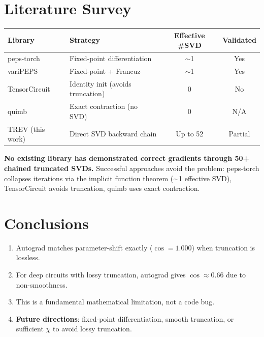 \documentclass[11pt]{article}
\begin{document}
\section{Literature Survey}

\begin{center}
\begin{tabular}{p{2.8cm}p{4.5cm}cc}
\toprule
Library & Strategy & Effective \#SVD & Validated \\
\midrule
peps-torch~\cite{liao2019differentiable} & Fixed-point differentiation & $\sim$1 & Yes \\
variPEPS & Fixed-point + Francuz & $\sim$1 & Yes \\
TensorCircuit~\cite{zhang2023tensorcircuit} & Identity init (avoids truncation) & 0 & No \\
quimb~\cite{gray2018quimb} & Exact contraction (no SVD) & 0 & N/A \\
TREV (this work) & Direct SVD backward chain & Up to 52 & Partial \\
\bottomrule
\end{tabular}
\end{center}

\textbf{No existing library has demonstrated correct gradients through 50+ chained truncated SVDs.} Successful approaches avoid the problem: peps-torch collapses iterations via the implicit function theorem ($\sim$1 effective SVD), TensorCircuit avoids truncation, quimb uses exact contraction.

\section{Conclusions}

\begin{enumerate}
\item Autograd matches parameter-shift exactly ($\cos = 1.000$) when truncation is lossless.
\item For deep circuits with lossy truncation, autograd gives $\cos \approx 0.66$ due to non-smoothness.
\item This is a fundamental mathematical limitation, not a code bug.
\item \textbf{Future directions}: fixed-point differentiation, smooth truncation, or sufficient $\chi$ to avoid lossy truncation.
\end{enumerate}
\end{document}
